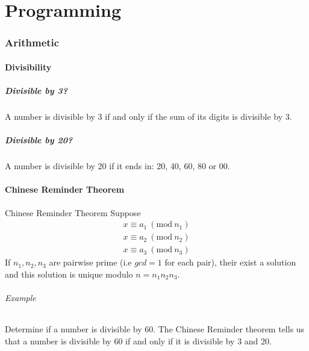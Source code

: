 \part{Programming}

\section{Arithmetic}

\subsection{Divisibility}
\subsubsection{Divisible by 3?}
A number is divisible by 3 if and only if the sum of its digits is divisible by 3.

\subsubsection{Divisible by 20?}
A number is divisible by 20 if it ends in: 20, 40, 60, 80 or 00.

\subsection{Chinese Reminder Theorem}

\theoremstyle{definition}
\begin{definition}{Chinese Reminder Theorem}
Suppose
\begin{equation}
    \begin{split}
        x \equiv a_1  \ (\textrm{mod}\ n_1) \\
        x \equiv a_2  \ (\textrm{mod}\ n_2) \\
        x \equiv a_3  \ (\textrm{mod}\ n_3)
    \end{split}
\end{equation}
If $n_1, n_2, n_3$ are pairwise prime (i.e $gcd = 1$ for each pair), their exist a solution and this solution is unique modulo $n = n_1 n_2 n_3$.
\end{definition}

\paragraph{Example}
Determine if a number is divisible by 60. The Chinese Reminder theorem tells us that a number is divisible by 60 if and only if it is divisible by 3 and 20.
